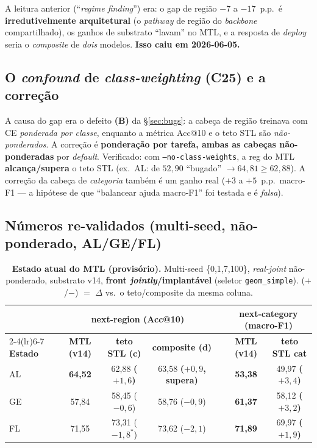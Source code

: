 \documentclass[11pt,a4paper]{article}
\newcommand{\good}[1]{\textcolor{green!45!black}{\textbf{#1}}}
\begin{document}
A leitura anterior (``\textit{regime finding}'') era: o gap de região $-7$ a $-17$~p.p.\ é
\textbf{irredutivelmente arquitetural} (o \textit{pathway} de região do \textit{backbone}
compartilhado), os ganhos de substrato ``lavam'' no MTL, e a resposta de \textit{deploy} seria o
\textit{composite} de \emph{dois} modelos. \textbf{Isso caiu em 2026-06-05.}

\subsection{O \textit{confound} de \textit{class-weighting} (C25) e a correção}

A causa do gap era o defeito \textbf{(B)} da \S\ref{sec:bugs}: a cabeça de região treinava com CE
\emph{ponderada por classe}, enquanto a métrica Acc@10 e o teto STL são \emph{não-ponderados}. A
correção é \textbf{ponderação por tarefa, ambas as cabeças não-ponderadas} por \textit{default}.
Verificado: com \texttt{--no-class-weights}, a reg do MTL \textbf{alcança/supera} o teto STL (ex.\ AL:
de $52{,}90$ ``bugado'' $\to 64{,}81 \ge 62{,}88$). A correção da cabeça de \emph{categoria} também é
um ganho real ($+3$ a $+5$~p.p.\ macro-F1 --- a hipótese de que ``balancear ajuda macro-F1'' foi
testada e é \emph{falsa}).

\subsection{Números re-validados (multi-seed, não-ponderado, AL/GE/FL)}

\begin{table}[H]
\centering
\footnotesize
\caption{\textbf{Estado atual do MTL (provisório).} Multi-seed \{0,1,7,100\}, \textit{real-joint}
não-ponderado, substrato v14, \textbf{front \textit{jointly}/implantável} (seletor \texttt{geom\_simple}).
($+$/$-$) $=$ $\Delta$ vs.\ o teto/composite da mesma coluna.}\label{tab:c25}
\renewcommand{\arraystretch}{1.2}
\begin{tabular}{lccc c cc}
\toprule
 & \multicolumn{3}{c}{\textbf{next-region (Acc@10)}} & & \multicolumn{2}{c}{\textbf{next-category (macro-F1)}} \\
\cmidrule(lr){2-4}\cmidrule(lr){6-7}
\textbf{Estado} & \textbf{MTL (v14)} & \textbf{teto STL (c)} & \textbf{composite (d)} & & \textbf{MTL (v14)} & \textbf{teto STL cat} \\
\midrule
AL & \good{64,52} & 62,88 \good{($+1,6$)} & 63,58 \good{($+0,9$, supera)} & & \good{53,38} & 49,97 \good{($+3,4$)} \\
GE & 57,84 & 58,45 ($-0,6$) & 58,76 ($-0,9$) & & \good{61,37} & 58,12 \good{($+3,2$)} \\
FL & 71,55 & 73,31 ($-1,8^{*}$) & 73,62 ($-2,1$) & & \good{71,89} & 69,97 \good{($+1,9$)} \\
\bottomrule
\end{tabular}
\end{table}
\end{document}

